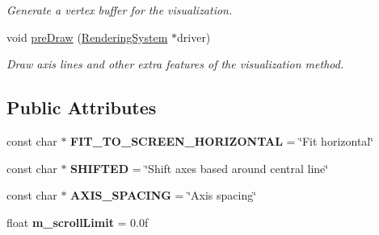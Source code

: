 \begin{DoxyCompactItemize}
\begin{DoxyCompactList}\small\item\em Generate a vertex buffer for the visualization. \end{DoxyCompactList}\item 
void \hyperlink{class_lots_of_lines_1_1_parallel_coordinates_visualization_method_a2df2c91354041c193e4055aeac7cfad2}{pre\+Draw} (\hyperlink{class_lots_of_lines_1_1_rendering_system}{Rendering\+System} $\ast$driver)\hypertarget{class_lots_of_lines_1_1_parallel_coordinates_visualization_method_a2df2c91354041c193e4055aeac7cfad2}{}\label{class_lots_of_lines_1_1_parallel_coordinates_visualization_method_a2df2c91354041c193e4055aeac7cfad2}

\begin{DoxyCompactList}\small\item\em Draw axis lines and other extra features of the visualization method. \end{DoxyCompactList}\end{DoxyCompactItemize}
\subsection*{Public Attributes}
\begin{DoxyCompactItemize}
\item 
const char $\ast$ {\bfseries F\+I\+T\+\_\+\+T\+O\+\_\+\+S\+C\+R\+E\+E\+N\+\_\+\+H\+O\+R\+I\+Z\+O\+N\+T\+AL} = \char`\"{}Fit horizontal\char`\"{}\hypertarget{class_lots_of_lines_1_1_parallel_coordinates_visualization_method_aefad54ada3adf700219394f34e862162}{}\label{class_lots_of_lines_1_1_parallel_coordinates_visualization_method_aefad54ada3adf700219394f34e862162}

\item 
const char $\ast$ {\bfseries S\+H\+I\+F\+T\+ED} = \char`\"{}Shift axes based around central line\char`\"{}\hypertarget{class_lots_of_lines_1_1_parallel_coordinates_visualization_method_a6800a60bb4e99b4f58d45affdf46a314}{}\label{class_lots_of_lines_1_1_parallel_coordinates_visualization_method_a6800a60bb4e99b4f58d45affdf46a314}

\item 
const char $\ast$ {\bfseries A\+X\+I\+S\+\_\+\+S\+P\+A\+C\+I\+NG} = \char`\"{}Axis spacing\char`\"{}\hypertarget{class_lots_of_lines_1_1_parallel_coordinates_visualization_method_abb6773006f0f62973b62093a6b1ca987}{}\label{class_lots_of_lines_1_1_parallel_coordinates_visualization_method_abb6773006f0f62973b62093a6b1ca987}

\item 
float {\bfseries m\+\_\+scroll\+Limit} = 0.\+0f\hypertarget{class_lots_of_lines_1_1_parallel_coordinates_visualization_method_a70616701546af28d381850d6761d3acf}{}\label{class_lots_of_lines_1_1_parallel_coordinates_visualization_method_a70616701546af28d381850d6761d3acf}

\end{DoxyCompactItemize}


